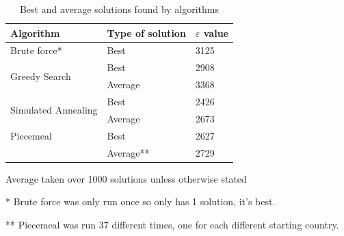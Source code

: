 \documentclass[12pt]{report}
\begin{document}
\begin{table}[H]
\centering
\caption{Best and average solutions found by algorithms}
\label{solutionsFound}
\begin{tabular}{|l|l|l|}
\hline
Algorithm                            & Type of solution & $\varepsilon$ value \\ \hline
Brute force*                          & Best             & 3125                \\ \hline
\multirow{2}{*}{Greedy Search}        & Best             & 2908                \\ \cline{2-3} 
                                     & Average          & 3368                \\ \hline
\multirow{2}{*}{Simulated Annealing} & Best             & 2426                \\ \cline{2-3}
                                     & Average          & 2673                \\ \hline
Piecemeal                            & Best             & 2627                \\ \cline{2-3}
                                     & Average**          & 2729                \\ \hline
\end{tabular}
\end{table}
Average taken over 1000 solutions unless otherwise stated

* Brute force was only run once so only has 1 solution, it's best.

** Piecemeal was run 37 different times, one for each different starting country.

\clearpage
\renewcommand{\bibsection}{\section*{References}}
{}

\end{document}
